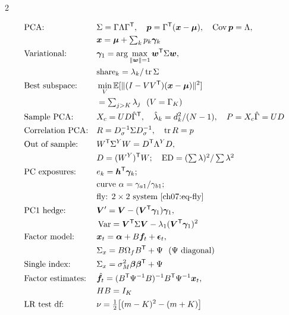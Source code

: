\begin{paracol}{2}
\begin{keyformulas}
\begin{align*}
&\text{PCA:} && \Sigma=\Gamma\Lambda\Gamma^{\mathsf T},\quad
  \bm p=\Gamma^{\mathsf T}(\bm x-\bm\mu),\quad \operatorname{Cov}\bm p=\Lambda,\\
& && \bm x=\bm\mu+\textstyle\sum_kp_k\bm\gamma_k\\
&\text{Variational:} && \bm\gamma_1=\arg\max_{\|\bm w\|=1}\bm w^{\mathsf T}\Sigma\bm w,\\
& && \text{share}_k=\lambda_k/\operatorname{tr}\Sigma\\
&\text{Best subspace:} && \min_V\mathbb{E}[\|(I-VV^{\mathsf T})(\bm x-\bm\mu)\|^2]\\
& && =\textstyle\sum_{j>K}\lambda_j\ \ (V=\Gamma_K)\\
&\text{Sample PCA:} && X_c=UD\hat\Gamma^{\mathsf T},\quad
  \hat\lambda_k=d_k^2/(N-1),\quad P=X_c\hat\Gamma=UD\\
&\text{Correlation PCA:} && R=D_\sigma^{-1}\Sigma D_\sigma^{-1},\quad \operatorname{tr} R=p\\
&\text{Out of sample:} && W^{\mathsf T}\Sigma^YW=D^{\mathsf T}\Lambda^YD,\\
& && D=(W^Y)^{\mathsf T} W;\quad \mathrm{ED}=(\textstyle\sum\lambda)^2/\textstyle\sum\lambda^2\\
&\text{PC exposures:} && e_k=\bm h^{\mathsf T}\bm\gamma_k;\\
& && \text{curve } \alpha=\gamma_{a1}/\gamma_{b1};\\
& && \text{fly: } 2\times2\text{ system \eqref{ch07:eq-fly}}\\
&\text{PC1 hedge:} && \bm V'=\bm V-(\bm V^{\mathsf T}\bm\gamma_1)\bm\gamma_1,\\
& && \operatorname{Var}=\bm V^{\mathsf T}\Sigma\bm V-\lambda_1(\bm V^{\mathsf T}\bm\gamma_1)^2\\
&\text{Factor model:} && \bm x_t=\bm\alpha+B\bm f_t+\bm\epsilon_t,\\
& && \Sigma_x=B\Omega_fB^{\mathsf T}+\Psi\ \ (\Psi\text{ diagonal})\\
&\text{Single index:} && \Sigma_x=\sigma_M^2\bm\beta\bm\beta^{\mathsf T}+\Psi\\
&\text{Factor estimates:} && \hat{\bm f}_t=(B^{\mathsf T}\Psi^{-1}B)^{-1}B^{\mathsf T}\Psi^{-1}\bm x_t,\\
& && HB=I_K\\
&\text{LR test df:} && \nu=\tfrac12\bigl[(m-K)^2-(m+K)\bigr]
\end{align*}
\end{keyformulas}


\end{paracol}
